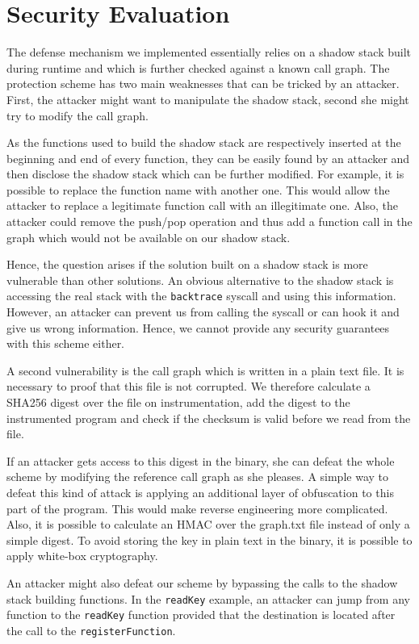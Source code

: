 \documentclass{llncs}
\begin{document}
\section{Security Evaluation}
The defense mechanism we implemented essentially relies on a shadow stack built during runtime and which is further checked against a known call graph. The protection scheme has two main weaknesses that can be tricked by an attacker. First, the attacker might want to manipulate the shadow stack, second she might try to modify the call graph.

As the functions used to build the shadow stack are respectively inserted at the beginning and end of every function, they can be easily found by an attacker and then disclose the shadow stack which can be further modified. For example, it is possible to replace the function name with another one. This would allow the attacker to replace a legitimate function call with an illegitimate one. Also, the attacker could remove the push/pop operation and thus add a function call in the graph which would not be available on our shadow stack.

Hence, the question arises if the solution built on a shadow stack is more vulnerable than other solutions. An obvious alternative to the shadow stack is accessing the real stack with the \texttt{backtrace} syscall and using this information. However, an attacker can prevent us from calling the syscall or can hook it and give us wrong information. Hence, we cannot provide any security guarantees with this scheme either.

A second vulnerability is the call graph which is written in a plain text file. It is necessary to proof that this file is not corrupted. We therefore calculate a SHA256 digest over the file on instrumentation, add the digest to the instrumented program and check if the checksum is valid before we read from the file.

If an attacker gets access to this digest in the binary, she can defeat the whole scheme by modifying the reference call graph as she pleases.
A simple way to defeat this kind of attack is applying an additional layer of obfuscation to this part of the program. This would make reverse engineering more complicated.
Also, it is possible to calculate an HMAC over the graph.txt file instead of only a simple digest. To avoid storing the key in plain text in the binary, it is possible to apply white-box cryptography.

An attacker might also defeat our scheme by bypassing the calls to the shadow stack building functions. In the \texttt{readKey} example, an attacker can jump from any function to the \texttt{readKey} function provided that the destination is located after the call to the \texttt{registerFunction}. %
\end{document}
